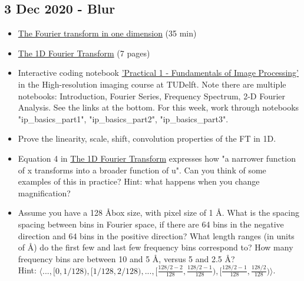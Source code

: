 \documentclass[11pt, oneside]{article}   	%
\begin{document}
\subsection{3 Dec 2020 - Blur}
\begin{itemize}
	\item \href{https://youtu.be/27bNryOu84g}{The Fourier transform in one dimension} (35 min)
	\item \href{https://cryoemprinciples.yale.edu/sites/default/files/files/3%20Fourier1D.pdf}{The 1D Fourier Transform} (7 pages)
	\item Interactive coding notebook \href{https://gitlab.tudelft.nl/aj-lab/teaching/-/wikis/NB4020}{'Practical 1 - Fundamentals of Image Processing'} in the High-resolution imaging course at TUDelft. Note there are multiple notebooks: Introduction, Fourier Series, Frequency Spectrum, 2-D Fourier Analysis. See the links at the bottom. For this week, work through notebooks "ip\_basics\_part1", "ip\_basics\_part2", "ip\_basics\_part3".
\end{itemize}
\begin{itemize}
	\item Prove the linearity, scale, shift, convolution properties of the FT in 1D.
	\item Equation 4 in \href{https://cryoemprinciples.yale.edu/sites/default/files/files/3%20Fourier1D.pdf}{The 1D Fourier Transform} expresses how "a narrower function of x transforms into a broader function of u". Can you think of some examples of this in practice? Hint: what happens when you change magnification? 
	\item Assume you have a 128 \AA box size, with pixel size of 1 \AA. What is the spacing spacing between bins in Fourier space, if there are 64 bins in the negative direction and 64 bins in the positive direction? What length ranges (in units of \AA) do the first few and last few frequency bins correspond to?  How many frequency bins are between 10 and 5 \AA, versus 5 and 2.5 \AA? \\ Hint: $\langle..., [0,1/128), [1/128,2/128), ... , [\frac{128/2-2}{128}, \frac{128/2-1}{128}),  [\frac{128/2-1}{128}, \frac{128/2}{128})\rangle$.
\end{itemize}

\pagebreak
\end{document}
